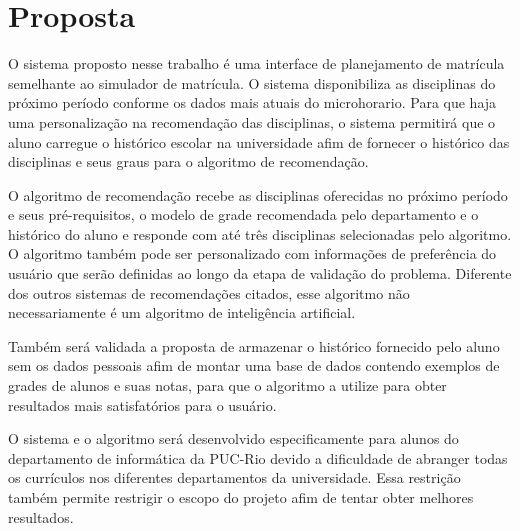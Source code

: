 \chapter{Proposta}
\label{cha:Proposta}


O sistema proposto nesse trabalho é uma interface de planejamento de matrícula semelhante ao simulador de matrícula. O sistema disponibiliza as disciplinas do próximo período conforme os dados mais atuais do microhorario. Para que haja uma personalização na recomendação das disciplinas, o sistema permitirá que o aluno carregue o histórico escolar na universidade afim de fornecer o histórico das disciplinas e seus graus para o algoritmo de recomendação.

O algoritmo de recomendação recebe as disciplinas oferecidas no próximo período e seus pré-requisitos, o modelo de grade recomendada pelo departamento e o histórico do aluno e responde com até três disciplinas selecionadas pelo algoritmo. O algoritmo também pode ser personalizado com informações de preferência do usuário que serão definidas ao longo da etapa de validação do problema. Diferente dos outros sistemas de recomendações citados, esse algoritmo não necessariamente é um algoritmo de inteligência artificial.

Também será validada a proposta de armazenar o histórico fornecido pelo aluno sem os dados pessoais afim de montar uma base de dados contendo exemplos de grades de alunos e suas notas, para que o algoritmo a utilize para obter resultados mais satisfatórios para o usuário.

O sistema e o algoritmo será desenvolvido especificamente para alunos do departamento de informática da PUC-Rio devido a dificuldade de abranger todas os currículos nos diferentes departamentos da universidade. Essa restrição também permite restrigir o escopo do projeto afim de tentar obter melhores resultados.





